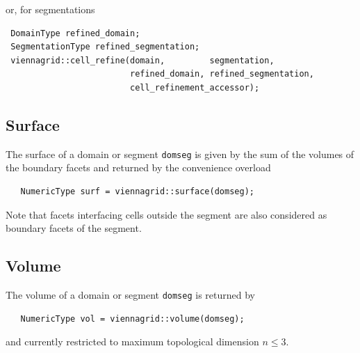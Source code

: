  \pagebreak
 
 or, for segmentations
 \begin{lstlisting}
 DomainType refined_domain;
 SegmentationType refined_segmentation;
 viennagrid::cell_refine(domain,         segmentation,
                         refined_domain, refined_segmentation,
                         cell_refinement_accessor);
 \end{lstlisting}


 \subsection{Surface}
 The surface of a domain or segment \lstinline|domseg| is given by the sum of the volumes of the boundary facets and returned by the convenience overload
  \begin{lstlisting}
   NumericType surf = viennagrid::surface(domseg);
  \end{lstlisting}
  Note that facets interfacing cells outside the segment are also considered as boundary facets of the segment.


  \subsection{Volume}
  The volume of a domain or segment \lstinline|domseg| is returned by
  \begin{lstlisting}
   NumericType vol = viennagrid::volume(domseg);
  \end{lstlisting}
  and currently restricted to maximum topological dimension $n \leq 3$.




